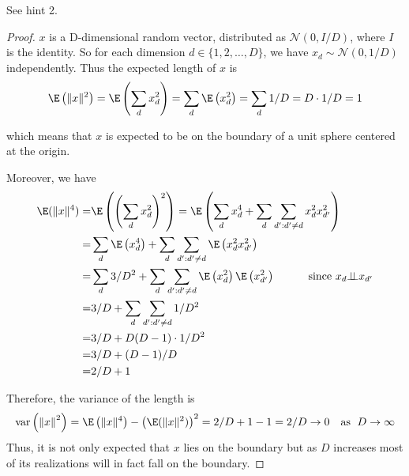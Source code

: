 \documentclass{article}
\begin{document}
\vspace{0.4in}

\begin{exercise}
See hint 2.
\end{exercise}

\begin{proof}
$x$ is a D-dimensional random vector, distributed as $\mathcal{N}(0,I/D)$, where $I$ is the identity. So for each dimension $d\in \{1,2,\ldots,D\}$, we have $x_d\sim\mathcal{N}(0,1/D)$ independently. Thus the expected length of $x$ is
\begin{align*}
\E\left(\lVert x \rVert^2\right) = \E\left(\sum_d{x_d^2}\right) = \sum_{d} \E\left(x_d^2\right) = \sum_{d} 1/D = D\cdot 1/D = 1
\end{align*}

which means that $x$ is expected to be on the boundary of a unit sphere centered at the origin.

Moreover, we have
\begin{align*}
\E(\|x\|^4) =& \E\left(\left(\sum_{d}x_d^2\right)^2\right)=\E\left(\sum_d x_d^4 + \sum_{d}\sum_{d':d'\neq d}x_d^2 x_{d'}^2\right)\\
=& \sum_{d}\E\left(x_d^4\right) + \sum_{d}\sum_{d':d'\neq d}\E\left(x_d^2 x_{d'}^2\right)\\
=& \sum_{d} 3/D^2 + \sum_{d}\sum_{d':d'\neq d} \E\left(x_d^2\right)\E\left(x_{d'}^2\right)\qquad\quad\text{since }x_d{\perp\!\!\!\perp} x_{d'}\\
=& 3/D + \sum_{d}\sum_{d':d'\neq d} 1/D^2\\
=& 3/D + D(D-1)\cdot 1/D^2\\
=& 3/D + (D-1)/D\\
=& 2/D + 1
\end{align*}

Therefore, the variance of the length is
$$ \text{var}\left({\lVert x \rVert}^2 \right) = \E\left(\|x\|^4\right)-\left(\E(\|x\|^2)\right)^2=
2/D + 1 - 1 = 2/D \rightarrow 0 \quad\text{as }\;D\rightarrow\infty$$
Thus, it is not only expected that $x$ lies on the boundary but as $D$ increases most of its realizations will in fact fall on the boundary.
\end{proof}
\end{document}
